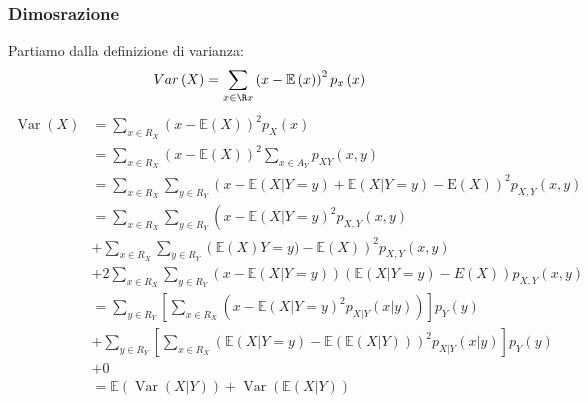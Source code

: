 \subsubsection*{Dimosrazione}
Partiamo dalla definizione di varianza:
\[
	Var \left(X\right) = \sum_{x \in \R x} \left(x - \mathbb{E}\left(x\right)\right)^2 p_x\left(x\right)
\]
\begin{align*}
	\operatorname{Var}(X) & =\sum_{x \in R_X}(x-\mathbb{E}(X))^2 p_X(x)                                                                                                                    \\
	                      & =\sum_{x \in R_X}(x-\mathbb{E}(X))^2 \sum_{x \in A_Y} p_{X Y}(x, y)                                                                                            \\
	                      & =\sum_{x \in R_X} \sum_{y \in R_Y}(x-\mathbb{E}(X | Y=y)+\mathbb{E}(X | Y=y) -\mathrm{E}(X))^2 p_{X,Y}(x, y)                                                   \\
	                      & =\sum_{x \in R_X} \sum_{ y \in R_Y}\left(x-\mathbb{E}(X | Y=y)^2 p_{X, Y}(x, y)\right.                                                                         \\
	                      & +\sum_{x \in R_X} \sum_{y \in R_Y}\left(\mathbb{E}(X) Y=y)-\mathbb{E}(X)\right)^2 p_{X,Y} (x, y)                                                               \\
	                      & +2 \sum_{x \in R_X} \sum_{y \in R_Y}\left(x-\mathbb{E}(X | Y=y)\right)(\mathbb{E}(X | Y=y)-E(X))p_{X,Y} \left(x,y\right)                                       \\
	                      & =\sum_{y \in  R_Y}\left[\sum_{x \in R_X}\left(x-\mathbb{E}\left(X | Y=y\right)^2 p_{X| Y}(x | y)\right)\right] p_Y(y)                                          \\
	                      & +\sum_{y \in R_Y}\left[\sum_{x \in  R_X}\left(\mathbb{E}(X | Y=y)-\mathbb{E} \left(\mathbb{E}\left(X | Y\right)\right)\right)^2 p_{X | Y}(x | y)\right] p_Y(y) \\
	                      & +0                                                                                                                                                             \\
	                      & =\mathbb{E}(\operatorname{Var}(X | Y))+\operatorname{Var}(\mathbb{E}(X | Y))                                                                                   \\
	                      &
\end{align*}

